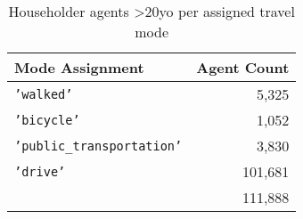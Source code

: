 \begin{table}[htb]
\caption{Householder agents >20yo per assigned travel mode}
\label{tab:agents_counts_travel_mode}
\small
\vspace{-6pt}
\begin{center}
\begin{tabular}{lr}
\toprule
\bf Mode Assignment & \bf Agent Count\\
\midrule
\texttt{'walked'}                   &       5,325       \\
\texttt{'bicycle'}                  &       1,052     \\
\texttt{'public\_transportation'}   &       3,830     \\
\texttt{'drive'}                    &     101,681      \\
\cline{2-2}
                                    &     111,888   \\
\bottomrule
\end{tabular}
\end{center}
\end{table}